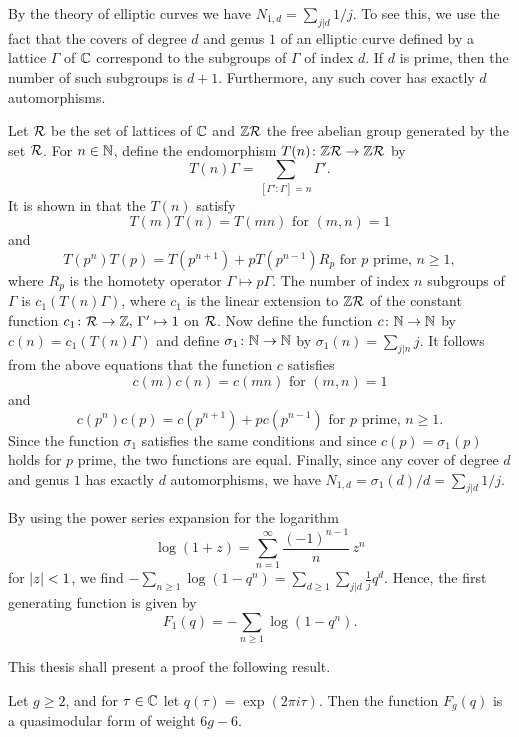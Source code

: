 \begin{expl}
 By the theory of elliptic curves we have $N_{1,d}=\sum_{j|d}1/j$. To see this, we use the fact that the covers of degree $d$ and genus $1$ of an elliptic curve defined by a lattice $\Gamma$ of $\mathbb{C}$ correspond to the subgroups of $\Gamma$ of index $d$. If $d$ is prime, then the number of such subgroups is $d+1$. Furthermore, any such cover has exactly $d$ automorphisms.
 
 Let $\mathcal{R}$ be the set of lattices of $\mathbb{C}$ and $\mathbb{Z}\mathcal{R}$ the free abelian group generated by the set $\mathcal{R}$. For $n\in\mathbb{N}$, define the endomorphism $T(n)\colon\mathbb{Z}\mathcal{R}\to\mathbb{Z}\mathcal{R}$ by
 \[
  T(n)\Gamma=\sum_{[\Gamma':\Gamma] = n}\Gamma'.
 \]
 It is shown in \cite[Ch.\ VII, Prop.\ 10]{Serre1973} that the $T(n)$ satisfy 
 \[T(m)T(n)=T(mn) \text{ for } (m,n)=1 \]
 and
 \[T(p^n)T(p)=T(p^{n+1})+pT(p^{n-1})R_p \text{ for } p \text{ prime, } n\geq1,\]
 where $R_p$ is the homotety operator $\Gamma\mapsto p\Gamma$. The number of index $n$ subgroups of $\Gamma$ is $c_1(T(n)\Gamma)$, where $c_1$ is the linear extension to $\mathbb{Z}\mathcal{R}$ of the constant function $c_1\colon\mathcal{R}\to\mathbb{Z},\, \Gamma'\mapsto 1$ on $\mathcal{R}$. Now define the function $c\colon \mathbb{N}\to\mathbb{N}$ by $c(n)=c_1(T(n)\Gamma)$ and define $\sigma_1\colon\mathbb{N}\to\mathbb{N}$ by $\sigma_1(n)=\sum_{j|n}j$. It follows from the above equations that the function $c$ satisfies \[c(m)c(n)=c(mn) \text{ for } (m,n)=1 \]
 and
 \[c(p^n)c(p)=c(p^{n+1})+pc(p^{n-1}) \text{ for } p \text{ prime, } n\geq1.\]
 Since the function $\sigma_1$ satisfies the same conditions and since $c(p)=\sigma_1(p)$ holds for $p$ prime, the two functions are equal. Finally, since any cover of degree $d$ and genus $1$ has exactly $d$ automorphisms, we have $N_{1,d}=\sigma_1(d)/d=\sum_{j|d}1/j$.
 
 By using the power series expansion for the logarithm \[\log(1+z)=\sum_{n=1}^{\infty}\frac{(-1)^{n-1}}{n}\,z^n\] for $|z|<1$, we find $-\sum_{n\geq 1}\log(1-q^n)=\sum_{d\geq 1}\sum_{j|d}\frac{1}{j}q^d.$
 Hence, the first generating function is given by \[F_1(q)=-\sum_{n\geq 1}\log(1-q^n).\]
\end{expl}

This thesis shall present a proof  the following result.

\begin{thm}
 Let $g\geq 2$, and for $\tau\in\mathbb{C}$ let $q(\tau)=\exp(2\pi i\tau)$. Then the function $F_g(q)$ is a quasimodular form of weight $6g-6$.
\end{thm}

